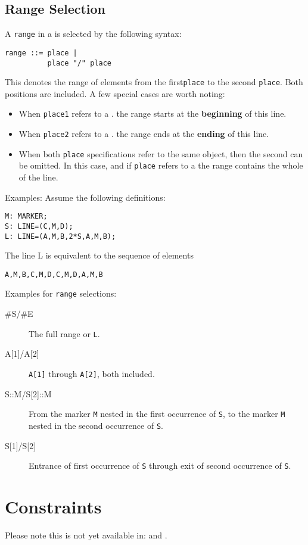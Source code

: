 \subsection{Range Selection}
\label{sec:arange}
A \texttt{range} in a  is selected 
by the following syntax:
\begin{verbatim}
range ::= place |
          place "/" place
\end{verbatim}
This denotes the range of elements from the first\texttt{place} to
the second \texttt{place}. Both positions are included.
A few special cases are worth noting:
\begin{itemize}
\item
When \texttt{place1} refers to a .
the range starts at the \textbf{beginning} of this line.
\item
When \texttt{place2} refers to a .
the range ends at the \textbf{ending} of this line.
\item
When both \texttt{place} specifications refer to the same object,
then the second can be omitted.
In this case, and if \texttt{place} refers to a
 the range contains the whole of the line.
\end{itemize}
\noindent Examples: Assume the following definitions:
\begin{verbatim}
M: MARKER;
S: LINE=(C,M,D);
L: LINE=(A,M,B,2*S,A,M,B);
\end{verbatim}
The line L is equivalent to the sequence of elements
\begin{verbatim}
A,M,B,C,M,D,C,M,D,A,M,B
\end{verbatim}
\noindent Examples for \texttt{range} selections:
\begin{description}
\item[\#S/\#E]
  The full range or \texttt{L}.
\item[{A[1]/A[2]}]
  \texttt{A[1]} through \texttt{A[2]}, both included.
\item[{S::M/S[2]::M}]
  From the marker \texttt{M} nested in the first occurrence of
  \texttt{S},
  to the marker \texttt{M} nested in the second occurrence of
  \texttt{S}. 
\item[{S[1]/S[2]}]
  Entrance of first occurrence of \texttt{S} through
  exit of second occurrence of \texttt{S}.
\end{description}

\section{Constraints}
\label{sec:aconstraint}
Please note this is not yet available in: 
\noopalt and \noopalcycl.

